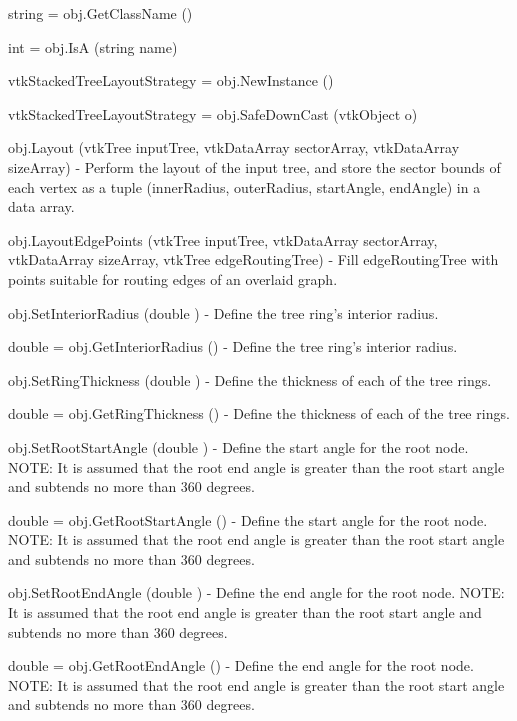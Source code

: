 \begin{DoxyItemize}
\item {\ttfamily string = obj.\-Get\-Class\-Name ()}  
\item {\ttfamily int = obj.\-Is\-A (string name)}  
\item {\ttfamily vtk\-Stacked\-Tree\-Layout\-Strategy = obj.\-New\-Instance ()}  
\item {\ttfamily vtk\-Stacked\-Tree\-Layout\-Strategy = obj.\-Safe\-Down\-Cast (vtk\-Object o)}  
\item {\ttfamily obj.\-Layout (vtk\-Tree input\-Tree, vtk\-Data\-Array sector\-Array, vtk\-Data\-Array size\-Array)} -\/ Perform the layout of the input tree, and store the sector bounds of each vertex as a tuple (inner\-Radius, outer\-Radius, start\-Angle, end\-Angle) in a data array.  
\item {\ttfamily obj.\-Layout\-Edge\-Points (vtk\-Tree input\-Tree, vtk\-Data\-Array sector\-Array, vtk\-Data\-Array size\-Array, vtk\-Tree edge\-Routing\-Tree)} -\/ Fill edge\-Routing\-Tree with points suitable for routing edges of an overlaid graph.  
\item {\ttfamily obj.\-Set\-Interior\-Radius (double )} -\/ Define the tree ring's interior radius.  
\item {\ttfamily double = obj.\-Get\-Interior\-Radius ()} -\/ Define the tree ring's interior radius.  
\item {\ttfamily obj.\-Set\-Ring\-Thickness (double )} -\/ Define the thickness of each of the tree rings.  
\item {\ttfamily double = obj.\-Get\-Ring\-Thickness ()} -\/ Define the thickness of each of the tree rings.  
\item {\ttfamily obj.\-Set\-Root\-Start\-Angle (double )} -\/ Define the start angle for the root node. N\-O\-T\-E\-: It is assumed that the root end angle is greater than the root start angle and subtends no more than 360 degrees.  
\item {\ttfamily double = obj.\-Get\-Root\-Start\-Angle ()} -\/ Define the start angle for the root node. N\-O\-T\-E\-: It is assumed that the root end angle is greater than the root start angle and subtends no more than 360 degrees.  
\item {\ttfamily obj.\-Set\-Root\-End\-Angle (double )} -\/ Define the end angle for the root node. N\-O\-T\-E\-: It is assumed that the root end angle is greater than the root start angle and subtends no more than 360 degrees.  
\item {\ttfamily double = obj.\-Get\-Root\-End\-Angle ()} -\/ Define the end angle for the root node. N\-O\-T\-E\-: It is assumed that the root end angle is greater than the root start angle and subtends no more than 360 degrees.  

\end{DoxyItemize}

